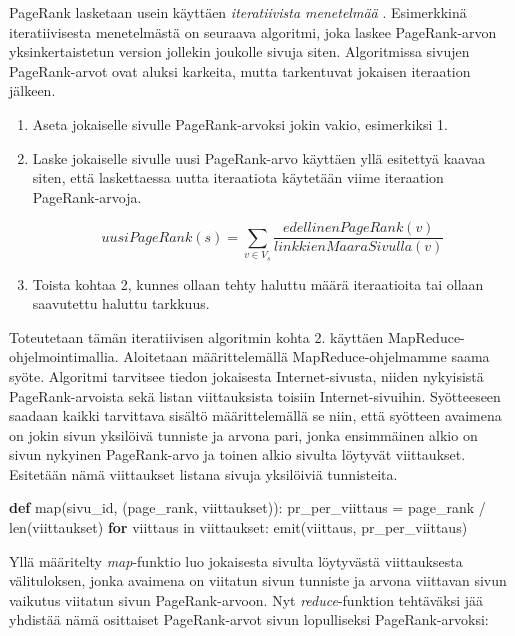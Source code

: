 \documentclass[finnish]{templates/tktltiki2}
\newenvironment{Shaded}{}{}
\newcommand{\KeywordTok}[1]{\textcolor[rgb]{0.00,0.44,0.13}{\textbf{{#1}}}}
\newcommand{\DataTypeTok}[1]{\textcolor[rgb]{0.56,0.13,0.00}{{#1}}}
\newcommand{\NormalTok}[1]{{#1}}
\theoremstyle{definition}
\theoremstyle{remark}
\begin{document}
PageRank lasketaan usein käyttäen \emph{iteratiivista menetelmää}
\cite{pagerank-mapreduce}. Esimerkkinä iteratiivisesta menetelmästä
on seuraava algoritmi, joka laskee PageRank-arvon yksinkertaistetun
version jollekin joukolle sivuja siten. Algoritmissa sivujen
PageRank-arvot ovat aluksi karkeita, mutta tarkentuvat jokaisen
iteraation jälkeen.

\begin{enumerate}
\def\labelenumi{\arabic{enumi}.}
\item
  Aseta jokaiselle sivulle PageRank-arvoksi jokin vakio, esimerkiksi 1.
\item
  Laske jokaiselle sivulle uusi PageRank-arvo käyttäen yllä esitettyä
  kaavaa siten, että laskettaessa uutta iteraatiota käytetään viime
  iteraation PageRank-arvoja.

  \[
  uusiPageRank(s) = \sum_{v \in V_s} \frac {edellinenPageRank(v)} {linkkienMaaraSivulla(v)}
  \]
\item
  Toista kohtaa 2, kunnes ollaan tehty haluttu määrä iteraatioita tai
  ollaan saavutettu haluttu tarkkuus.
\end{enumerate}

Toteutetaan tämän iteratiivisen algoritmin kohta 2. käyttäen
MapReduce-ohjelmointimallia. Aloitetaan määrittelemällä
MapReduce-ohjelmamme saama syöte. Algoritmi tarvitsee tiedon jokaisesta
Internet-sivusta, niiden nykyisistä PageRank-arvoista sekä listan
viittauksista toisiin Internet-sivuihin. Syötteeseen saadaan kaikki
tarvittava sisältö määrittelemällä se niin, että syötteen avaimena on
jokin sivun yksilöivä tunniste ja arvona pari, jonka ensimmäinen alkio
on sivun nykyinen PageRank-arvo ja toinen alkio sivulta löytyvät
viittaukset. Esitetään nämä viittaukset listana sivuja yksilöiviä
tunnisteita.

\begin{Shaded}
\begin{Highlighting}[]
\KeywordTok{def} \DataTypeTok{map}\NormalTok{(sivu_id, (page_rank, viittaukset)):}
    \NormalTok{pr_per_viittaus = page_rank / }\DataTypeTok{len}\NormalTok{(viittaukset)}
    \KeywordTok{for} \NormalTok{viittaus in viittaukset:}
        \NormalTok{emit(viittaus, pr_per_viittaus)}
\end{Highlighting}
\end{Shaded}

Yllä määritelty \emph{map}-funktio luo jokaisesta sivulta löytyvästä
viittauksesta välituloksen, jonka avaimena on viitatun sivun tunniste ja
arvona viittavan sivun vaikutus viitatun sivun PageRank-arvoon. Nyt
\emph{reduce}-funktion tehtäväksi jää yhdistää nämä osittaiset
PageRank-arvot sivun lopulliseksi PageRank-arvoksi:
\end{document}
